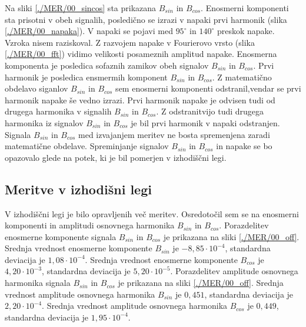 Na sliki \ref{./MER/00_sincos} sta prikazana $B_{sin}$ in $B_{cos}$. Enosmerni komponenti sta prisotni v obeh signalih, posledično se izrazi v napaki prvi harmonik (slika \ref{./MER/00_napaka}).
V napaki se pojavi med $\mathrm{95^\circ}$ in $\mathrm{140^\circ}$ preskok napake. Vzroka nisem raziskoval.
Z razvojem napake v Fourierovo vrsto (slika \ref{./MER/00_fft}) vidimo velikosti posameznih amplitud napake.
Enosmerna komponenta je posledica sofaznih zamikov obeh signalov $B_{sin}$ in $B_{cos}$. 
Prvi harmonik je posledica ensmermih komponent $B_{sin}$ in $B_{cos}$. Z matematično obdelavo siganlov $B_{sin}$ in $B_{cos}$ sem enosmerni komponenti odstranil,vendar se prvi harmonik napake še vedno izrazi. Prvi harmonik napake je odvisen tudi od drugega harmonika v signalih $B_{sin}$ in $B_{cos}$.
Z odstranitvijo tudi drugega harmonika iz signalov $B_{sin}$ in $B_{cos}$ je bil  prvi harmonik v napaki odstranjen.
Signala  $B_{sin}$ in $B_{cos}$ med izvajanjem meritev ne bosta spremenjena zaradi matematične obdelave. Spreminjanje signalov  $B_{sin}$ in $B_{cos}$ in napake se bo opazovalo glede na potek, ki je bil pomerjen v izhodiščni legi.
\newpage

\subsection{Meritve v izhodišni legi}
V izhodiščni legi je bilo opravljenih več meritev. Osredotočil sem se na enosmerni komponenti  in amplitudi osnovnega harmonika $B_{sin}$ in $B_{cos}$. 
Porazdelitev enosmerne komponente signala $B_{sin}$ in $B_{cos}$ je prikazana na sliki \ref{./MER/00_off}.
Srednja vrednost enosmerne komponente $B_{sin}$ je $-8,85 \cdot 10^{-4}$, standardna deviacija je $1,08\cdot 10^{-4}$.
Srednja vrednost enosmerne komponente $B_{cos}$ je $4,20 \cdot 10^{-3}$, standardna deviacija je $5,20\cdot 10^{-5}$.
Porazdelitev amplitude osnovnega harmonika signala $B_{sin}$ in $B_{cos}$ je prikazana na sliki \ref{./MER/00_off}.
Srednja vrednost amplitude osnovnega harmonika $B_{sin}$ je $0,451$, standardna deviacija je $2,20\cdot 10^{-4}$.
Srednja vrednost amplitude osnovnega harmonika $B_{cos}$ je $0,449$, standardna deviacija je $1,95\cdot 10^{-4}$.
\newpage
